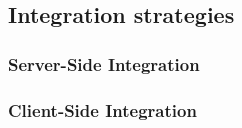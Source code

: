 \subsection{Integration strategies}

\subsubsection{Server-Side Integration}
\subsubsection{Client-Side Integration}